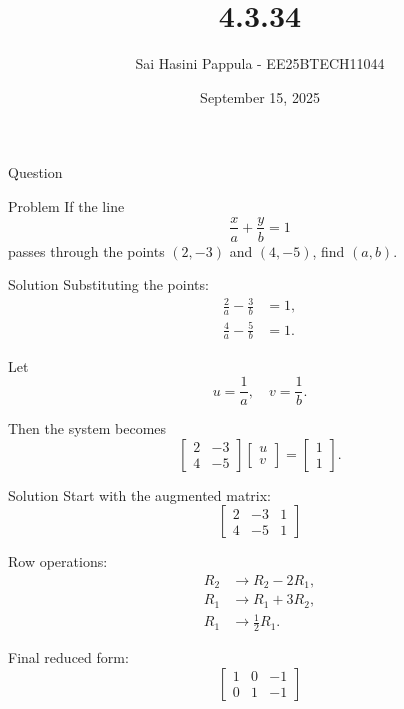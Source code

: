 \documentclass{beamer}
\title %
{4.3.34}
\date{September 15, 2025}
\author %
{Sai Hasini Pappula - EE25BTECH11044}
\begin{document}
\begin{frame}{Question}
\begin{block}{Problem}
If the line
\[
\frac{x}{a} + \frac{y}{b} = 1
\]
passes through the points $(2,-3)$ and $(4,-5)$, find $(a,b)$.
\end{block}
\end{frame}

\begin{frame}{Solution}
Substituting the points:
\begin{align}
\frac{2}{a} - \frac{3}{b} &= 1, \\
\frac{4}{a} - \frac{5}{b} &= 1.
\end{align}

Let
\begin{equation}
u = \frac{1}{a}, \quad v = \frac{1}{b}.
\end{equation}

Then the system becomes
\begin{equation}
\begin{bmatrix}
2 & -3 \\
4 & -5
\end{bmatrix}
\begin{bmatrix}
u \\ v
\end{bmatrix}
=
\begin{bmatrix}
1 \\ 1
\end{bmatrix}.
\end{equation}
\end{frame}

\begin{frame}{Solution}
Start with the augmented matrix:
\[
\left[\begin{array}{cc|c}
2 & -3 & 1 \\
4 & -5 & 1
\end{array}\right]
\]

Row operations:
\begin{align}
R_2 &\to R_2 - 2R_1, \\
R_1 &\to R_1 + 3R_2, \\
R_1 &\to \tfrac{1}{2}R_1.
\end{align}

Final reduced form:
\[
\left[\begin{array}{cc|c}
1 & 0 & -1 \\
0 & 1 & -1
\end{array}\right]
\]
\end{frame}
\end{document}
